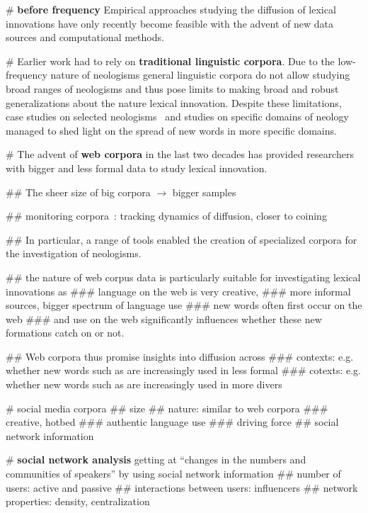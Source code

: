 \documentclass[a4paper, abstract=on]{scrartcl}
\renewcommand{\hw}[1]{\textbf{#1}}
\begin{document}
    \begin{easylist}[itemize]

      # \hw{before frequency} Empirical approaches studying the diffusion of lexical innovations have only recently become feasible with the advent of new data sources and computational methods.

      # Earlier work had to rely on \hw{traditional linguistic corpora}. Due to the low-frequency nature of neologisms general linguistic corpora do not allow studying broad ranges of neologisms and thus pose limits to making broad and robust generalizations about the nature lexical innovation. Despite these limitations, case studies on selected neologisms~\parencite{Hohenhaus2006} and studies on specific domains of neology~\parencite{Elsen2004} managed to shed light on the spread of new words in more specific domains.

      # The advent of \hw{web corpora} in the last two decades has provided researchers with bigger and less formal data to study lexical innovation.

        ## The sheer size of big corpora $\rightarrow$ bigger samples

        ## monitoring corpora~\parencite{Davies2013}: tracking dynamics of diffusion, closer to coining

        ## In particular, a range of tools enabled the creation of specialized corpora for the investigation of neologisms.~\parencite{Renouf2006,Kerremans2012,Lemnitzer,Gerard2017,Cartier2017}

        ## the nature of web corpus data is particularly suitable for investigating lexical innovations as
          ### language on the web is very creative,
          ### more informal sources, bigger spectrum of language use
          ### new words often first occur on the web
          ### and use on the web significantly influences whether these new formations catch on or not.

        ## Web corpora thus promise insights into diffusion across
          ### contexts: e.g. whether new words such as  are increasingly used in less formal
          ### cotexts: e.g. whether new words such as \ol{} are increasingly used in more divers

      # social media corpora \cite{Grieve2016,Eisenstein2014}
        ## size
        ## nature: similar to web corpora
          ### creative, hotbed
          ### authentic language use
          ### driving force
        ## social network information

      # \hw{social network analysis} getting at \enquote{changes in the numbers and communities of speakers} by using social network information
        ## number of users: active and passive
        ## interactions between users: influencers
        ## network properties: density, centralization

    \end{easylist}
\end{document}
